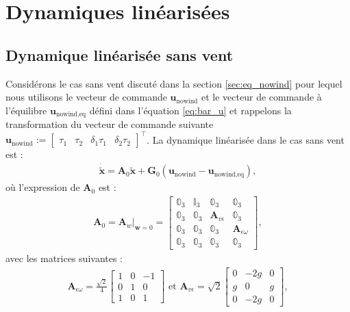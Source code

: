 \section{Dynamiques linéarisées}
\subsection{Dynamique linéarisée sans vent}
Considérons le cas sans vent discuté dans la section \ref{sec:eq_nowind} pour lequel nous utilisons le vecteur de commande $\boldsymbol{u}_{\text{nowind}}$  et le vecteur de commande à l'équilibre $\boldsymbol{u}_{\text{nowind},\text{eq}}$ défini dans l'équation \eqref{eq:bar_u} et rappelons la transformation du vecteur de commande suivante $ \boldsymbol{u}_{\text{nowind}} := \begin{bmatrix}\tau_{1}  \!&\! \tau_{2}  \!&\! \delta_{1}\tau_{1} \!&\! \delta_{2}\tau_{2} \end{bmatrix}^\top$. La dynamique linéarisée dans le cas sans vent est :
\begin{align}
    \label{eq:linearized}
     \boldsymbol{\dot{\tilde{x}}} = \boldsymbol{A}_{0} \tilde{\boldsymbol{x}} + \boldsymbol{G}_{0} (\boldsymbol{u}_{\text{nowind}}-\boldsymbol{u}_{\text{nowind},\text{eq}}),
\end{align}
où l'expression de $\boldsymbol{A}_{0}$ est : 
\begin{align}
    \label{matrice_A}
        \boldsymbol{A}_{0} = \boldsymbol{A}_{w} \Big|_{\boldsymbol{w}=0} =\begin{bmatrix}
        \mathbb{0}_{3} & \mathbb{I}_{3} & \mathbb{0}_{3} & \mathbb{0}_{3} \\
        \mathbb{0}_{3} & \mathbb{0}_{3} &  \boldsymbol{A}_{v\epsilon} & \mathbb{0}_{3} \\
        \mathbb{0}_{3} & \mathbb{0}_{3} & \mathbb{0}_{3} & \boldsymbol{A}_{\epsilon\omega} \\
        \mathbb{0}_{3} & \mathbb{0}_{3} & \mathbb{0}_{3} & \mathbb{0}_{3}
        \end{bmatrix},
\end{align}
avec les matrices suivantes : 
\begin{align*}
    \boldsymbol{A}_{\epsilon\omega} = \frac{\sqrt{2}}{4}\begin{bmatrix} 
        1 & 0 & -1 \\ 
        0 & 1 & 0  \\
       1 & 0 & 1
    \end{bmatrix} \text{ et } \boldsymbol{A}_{ v\epsilon} = \sqrt{2}\begin{bmatrix} 
        0 & -2g & 0\\
        g & 0 & g  \\ 
         0 & -2g & 0 \end{bmatrix},
\end{align*}
